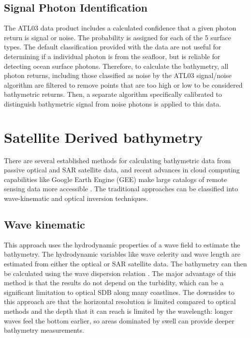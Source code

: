 \subsection{Signal Photon Identification}

The ATL03 data product includes a calculated confidence that a given photon return is signal or noise. The probability is assigned for each of the 5 surface types. The default classification provided with the data are not useful for determining if a individual photon is from the seafloor, but is reliable for detecting ocean surface photons. Therefore, to calculate the bathymetry, all photon returns, including those classified as noise by the ATL03 signal/noise algorithm are filtered to remove points that are too high or low to be considered bathymetric returns. Then, a separate algorithm specifically calibrated to distinguish bathymetric signal from noise photons is applied to this data.


\section{Satellite Derived bathymetry}
There are several established methods for calculating bathymetric data from passive optical and SAR satellite data, and recent advances in cloud computing capabilities like Google Earth Engine (GEE) \parencite{Gorelick2017a} make large catalogs of remote sensing data more accessible \parencite{Pike2019,Turner2021}. The traditional approaches can be classified into wave-kinematic and optical inversion techniques.  

\subsection{Wave kinematic}
This approach uses the hydrodynamic properties of a wave field to estimate the bathymetry. The hydrodynamic variables like wave celerity and wave length are estimated from either the optical or SAR satellite data. The bathymetry can then be calculated using the wave dispersion relation \cite{Almar2021e}. The major advantage of this method is that the results do not depend on the turbidity, which can be a significant limitation to optical SDB along many coastlines. The downsides to this approach are that the horizontal resolution is limited compared to optical methods and the depth that it can reach is limited by the wavelength: longer waves feel the bottom earlier, so areas dominated by swell can provide deeper bathymetry measurements.\parencite{Almar2021e}


